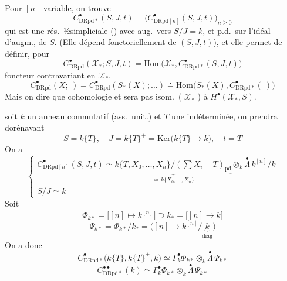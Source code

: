 \documentclass[11pt,a4paper]{article}
\begin{document}

Pour $[n]$ variable, on trouve
\[ C^\bullet_{\mathrm{DRpd}*}(S,J,t) = \bigl(C^\bullet_{\mathrm{DRpd}[n]}(S,J,t)\bigr)_{n \geq 0} \]
qui est une rés.\ ½simpliciale () avec aug.\ vers $S/J = k$, et p.d.\ sur l'idéal d'augm.,  de $S$. (Elle dépend fonctoriellement de $(S,J,t)$), et elle permet de définir, pour  
\[ C^\bullet_{\mathrm{DRpd}}(\mathcal{X}_*; S,J,t) = \mathrm{Hom}\bigl(\mathcal{X}_*, C^\bullet_{\mathrm{DRpd}*}(S,J,t)\bigr) \]
foncteur contravariant en $\mathcal{X}_*$, 
\[ C^\bullet_{\mathrm{DRpd}}(X; \ ) = C^\bullet_{\mathrm{DRpd}}(S_*(X); \ldots) \doteq \mathrm{Hom}\bigl(S_*(X), C^\bullet_{\mathrm{DRpd}*}(\ )\bigr) \]
Mais on  dire  que  cohomologie \ill{} et   sera pas isom.\ ( $\mathcal{X}_*$ ) à $H^\bullet(\mathcal{X}_*,S)$.

 soit $k$ un anneau commutatif (ass.\ unit.) et $T$ une indéterminée, on prendra dorénavant
\[ S = k\{T\}, \quad J = k\{T\}^+ = \mathrm{Ker}\bigl(k\{T\} \to k\bigr), \quad t = T \]
On a
\[ \begin{cases} C^\bullet_{\mathrm{DRpd}[n]}(S,J,t) \simeq \underbrace{k\{T, X_0, \ldots, X_n\}/(\sum X_i - T)_{\mathrm{pd}}}_{\simeq\, k\{X_0, \ldots, X_n\}} \otimes_k \overset{\bullet}{\Lambda}\, k^{[n]}/k \\ S/J \simeq k \end{cases} \]
Soit
\[ \Phi_{k*} = \bigl[[n] \mapsto k^{[n]}\bigr] \supset k_* = \bigl[[n] \to k\bigr] \]
\[ \Psi_{k*} = \Phi_{k*}/k_* = \bigl([n] \to k^{[n]}/\underbrace{k}_{\mathrm{diag}}\bigr) \]
On a donc
\[ C^\bullet_{\mathrm{DRpd}*}\bigl(k\{T\}, k\{T\}^+, k\bigr) \simeq \Gamma^\bullet_k \Phi_{k*} \otimes_k \overset{\bullet}{\Lambda}\, \Psi_{k*} \]
\[ C^{\bullet\bullet}_{\mathrm{DRpd}*}(k) \simeq \Gamma^\bullet_k \Phi_{k*} \otimes_k \overset{\bullet}{\Lambda}\, \Psi_{k*} \]
\end{document}
